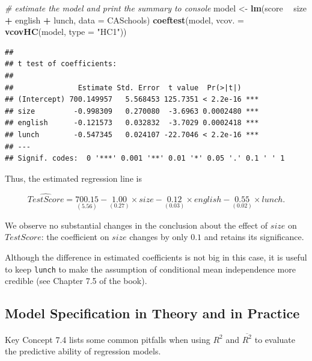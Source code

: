 \documentclass[]{book}
\newenvironment{Shaded}{\begin{snugshade}}{\end{snugshade}}
\newcommand{\KeywordTok}[1]{\textcolor[rgb]{0.13,0.29,0.53}{\textbf{#1}}}
\newcommand{\DataTypeTok}[1]{\textcolor[rgb]{0.13,0.29,0.53}{#1}}
\newcommand{\StringTok}[1]{\textcolor[rgb]{0.31,0.60,0.02}{#1}}
\newcommand{\CommentTok}[1]{\textcolor[rgb]{0.56,0.35,0.01}{\textit{#1}}}
\newcommand{\OperatorTok}[1]{\textcolor[rgb]{0.81,0.36,0.00}{\textbf{#1}}}
\newcommand{\NormalTok}[1]{#1}
\theoremstyle{definition}
\theoremstyle{definition}
\theoremstyle{definition}
\theoremstyle{remark}
\begin{document}
\begin{Shaded}
\begin{Highlighting}[]
\CommentTok{# estimate the model and print the summary to console}
\NormalTok{model <-}\StringTok{ }\KeywordTok{lm}\NormalTok{(score }\OperatorTok{~}\StringTok{ }\NormalTok{size }\OperatorTok{+}\StringTok{ }\NormalTok{english }\OperatorTok{+}\StringTok{ }\NormalTok{lunch, }\DataTypeTok{data =}\NormalTok{ CASchools)}
\KeywordTok{coeftest}\NormalTok{(model, }\DataTypeTok{vcov. =} \KeywordTok{vcovHC}\NormalTok{(model, }\DataTypeTok{type =} \StringTok{"HC1"}\NormalTok{))}
\end{Highlighting}
\end{Shaded}

\begin{verbatim}
## 
## t test of coefficients:
## 
##               Estimate Std. Error  t value  Pr(>|t|)    
## (Intercept) 700.149957   5.568453 125.7351 < 2.2e-16 ***
## size         -0.998309   0.270080  -3.6963 0.0002480 ***
## english      -0.121573   0.032832  -3.7029 0.0002418 ***
## lunch        -0.547345   0.024107 -22.7046 < 2.2e-16 ***
## ---
## Signif. codes:  0 '***' 0.001 '**' 0.01 '*' 0.05 '.' 0.1 ' ' 1
\end{verbatim}

Thus, the estimated regression line is

\[ \widehat{TestScore} = \underset{(5.56)}{700.15} - \underset{(0.27)}{1.00} \times size - \underset{(0.03)}{0.12} \times english - \underset{(0.02)}{0.55} \times lunch. \]

We observe no substantial changes in the conclusion about the effect of
\(size\) on \(TestScore\): the coefficient on \(size\) changes by only
\(0.1\) and retains its significance.

Although the difference in estimated coefficients is not big in this
case, it is useful to keep \texttt{lunch} to make the assumption of
conditional mean independence more credible (see Chapter 7.5 of the
book).

\subsection*{Model Specification in Theory and in
Practice}\label{model-specification-in-theory-and-in-practice}

Key Concept 7.4 lists some common pitfalls when using \(R^2\) and
\(\overline{R^2}\) to evaluate the predictive ability of regression
models.
\end{document}
